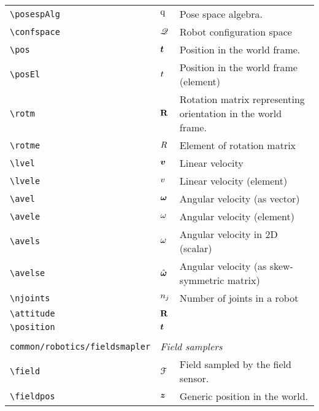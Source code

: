 \begin{longtable}{lll}
 {\color[rgb]{0.5,0.5,0.5}\texttt{\textbackslash posespAlg}} & $\text{q}$ &  Pose space algebra.\\ 
 {\color[rgb]{0.5,0.5,0.5}\texttt{\textbackslash confspace}} & $\mathscr{Q}$ &  Robot configuration space\\ 
 {\color[rgb]{0.5,0.5,0.5}\texttt{\textbackslash pos}} & $\boldsymbol{t}$ &  Position in the world frame.\\ 
 {\color[rgb]{0.5,0.5,0.5}\texttt{\textbackslash posEl}} & $t$ &  Position in the world frame (element)\\ 
 {\color[rgb]{0.5,0.5,0.5}\texttt{\textbackslash rotm}} & $\mathbf{R}$ &  Rotation matrix representing orientation in the world frame.\\ 
 {\color[rgb]{0.5,0.5,0.5}\texttt{\textbackslash rotme}} & $R$ &  Element of rotation matrix\\ 
 {\color[rgb]{0.5,0.5,0.5}\texttt{\textbackslash lvel}} & $\boldsymbol{v}$ &  Linear velocity\\ 
 {\color[rgb]{0.5,0.5,0.5}\texttt{\textbackslash lvele}} & $v$ &  Linear velocity (element)\\ 
 {\color[rgb]{0.5,0.5,0.5}\texttt{\textbackslash avel}} & $\boldsymbol{\omega}$ &  Angular velocity (as vector)\\ 
 {\color[rgb]{0.5,0.5,0.5}\texttt{\textbackslash avele}} & $\omega$ &  Angular velocity (element)\\ 
 {\color[rgb]{0.5,0.5,0.5}\texttt{\textbackslash avels}} & $\omega$ &  Angular velocity in 2D (scalar)\\ 
 {\color[rgb]{0.5,0.5,0.5}\texttt{\textbackslash avelse}} & $\hat{\boldsymbol{\omega}}$ &  Angular velocity (as skew-symmetric matrix)\\ 
 {\color[rgb]{0.5,0.5,0.5}\texttt{\textbackslash njoints}} & $n_{j}$ &  Number of joints in a robot\\ 
 {\color[rgb]{0.5,0.5,0.5}\texttt{\textbackslash attitude}} & $\mathbf{R}$ & \\ 
 {\color[rgb]{0.5,0.5,0.5}\texttt{\textbackslash position}} & $\boldsymbol{t}$ & \\ 
  &  & \\ 
 {\color[rgb]{0.5,0.5,0.5}\texttt{common/robotics/fieldsmapler}} & \multicolumn{2}{l}{\emph{Field samplers}}\\ 
 \hline
{\color[rgb]{0.5,0.5,0.5}\texttt{\textbackslash field}} & $\mathcal{F}$ &  Field sampled by the field sensor.\\ 
 {\color[rgb]{0.5,0.5,0.5}\texttt{\textbackslash fieldpos}} & $\boldsymbol{z}$ &  Generic position in the world.\\ 

\end{longtable}
